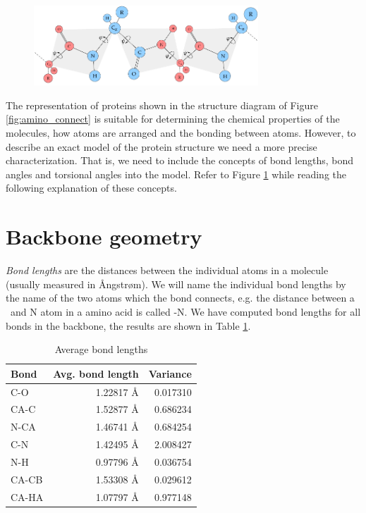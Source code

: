 \begin{figure}
  \centering
  \includegraphics[width=0.75\textwidth]{figures/protein-torsion-angles}
  \caption{}
  \label{fig:protein-torsion-angles}
\end{figure}

The representation of proteins shown in the structure diagram of
Figure \ref{fig:amino_connect} is suitable for determining the
chemical properties of the molecules, how atoms are arranged and the
bonding between atoms. However, to describe an exact model of the
protein structure we need a more precise characterization. That is, we
need to include the concepts of bond lengths, bond angles and
torsional angles into the model. Refer to Figure
\ref{fig:protein-torsion-angles} while reading the following
explanation of these concepts. 

\section{Backbone geometry}
\textit{Bond lengths} are the distances between the individual atoms
in a molecule (usually measured in Ångstrøm). We will name the
individual bond lengths by the name of the two atoms which the bond
connects, e.g. the distance between a \Ca\ and N atom in a amino acid
is called \Ca -N. We have computed bond lengths for all bonds in the
backbone, the results are shown in Table \ref{}.

\begin{table}
  \centering
  \begin{tabular}{lrr}
    \toprule
    Bond & Avg. bond length & Variance \\ \midrule
    C-O   & 1.22817 Å & 0.017310 \\
    CA-C  & 1.52877 Å & 0.686234 \\
    N-CA  & 1.46741 Å & 0.684254 \\ 
    C-N   & 1.42495 Å & 2.008427 \\
    N-H   & 0.97796 Å & 0.036754 \\
    CA-CB & 1.53308 Å & 0.029612 \\
    CA-HA & 1.07797 Å & 0.977148 \\ \bottomrule
  \end{tabular}
  \vspace{1mm}
  \caption{Average bond lengths}
  \label{tab:average_bond_lengths}
\end{table}

